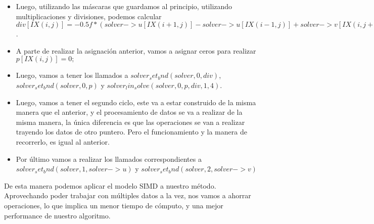 \begin{itemize}
\item Luego, utilizando las m\'ascaras que guardamos al principio, utilizando multiplicaciones y divisiones, podemos calcular $div[IX(i,j)] = - 0.5f * (solver->u[IX(i+1,j)] - solver->u[IX(i-1,j)] + solver->v[IX(i,j+1)] - solver->v[IX(i,j-1)]) / solver->N$.
\item A parte de realizar la asignaci\'on anterior, vamos a asignar ceros para realizar $p[IX(i,j)] = 0;$
\item Luego, vamos a tener los llamados a $solver_set_bnd ( solver, 0, div )$, $solver_set_bnd ( solver, 0, p )$ y $solver_lin_solve ( solver, 0, p, div, 1, 4 )$.
\item Luego, vamos a tener el segundo ciclo, este va a estar construido de la misma manera que el anterior, y el procesamiento de datos se va a realizar de la misma manera, la \'unica diferencia es que las operaciones se van a realizar trayendo los datos de otro puntero. Pero el funcionamiento y la manera de recorrerlo, es igual al anterior.
\item Por \'ultimo vamos a realizar los llamados correspondientes a $solver_set_bnd ( solver, 1, solver->u )$ y $solver_set_bnd ( solver, 2, solver->v )$
\end{itemize}

De esta manera podemos aplicar el modelo SIMD a nuestro m\'etodo. Aprovechando poder trabajar con m\'ultiples datos a la vez, nos vamos a ahorrar operaciones, lo que implica un menor tiempo de c\'omputo, y una mejor performance de nuestro algoritmo.

 
